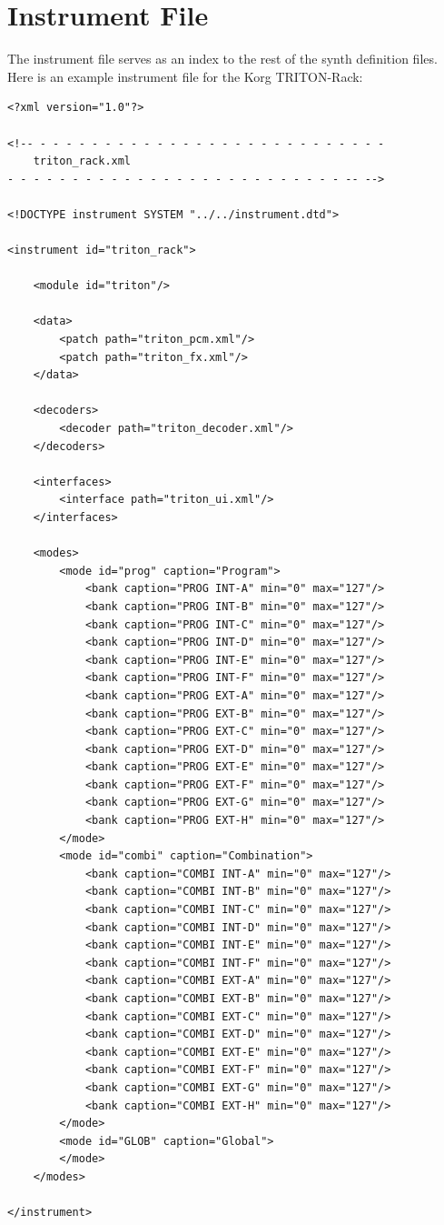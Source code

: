 \documentclass[a4paper,twoside,12pt]{article}
\begin{document}
\section{Instrument File}\label{instrument_file}
The instrument file serves as an index to the rest of the synth
definition files. Here is an example instrument file for the Korg
TRITON-Rack:

\begin{verbatim}
<?xml version="1.0"?>

<!-- - - - - - - - - - - - - - - - - - - - - - - - - - - -
    triton_rack.xml
- - - - - - - - - - - - - - - - - - - - - - - - - - -- -->

<!DOCTYPE instrument SYSTEM "../../instrument.dtd">

<instrument id="triton_rack">

    <module id="triton"/>

    <data>
        <patch path="triton_pcm.xml"/>
        <patch path="triton_fx.xml"/>
    </data>

    <decoders>
        <decoder path="triton_decoder.xml"/>
    </decoders>

    <interfaces>
        <interface path="triton_ui.xml"/>
    </interfaces>

    <modes>
        <mode id="prog" caption="Program">
            <bank caption="PROG INT-A" min="0" max="127"/>
            <bank caption="PROG INT-B" min="0" max="127"/>
            <bank caption="PROG INT-C" min="0" max="127"/>
            <bank caption="PROG INT-D" min="0" max="127"/>
            <bank caption="PROG INT-E" min="0" max="127"/>
            <bank caption="PROG INT-F" min="0" max="127"/>
            <bank caption="PROG EXT-A" min="0" max="127"/>
            <bank caption="PROG EXT-B" min="0" max="127"/>
            <bank caption="PROG EXT-C" min="0" max="127"/>
            <bank caption="PROG EXT-D" min="0" max="127"/>
            <bank caption="PROG EXT-E" min="0" max="127"/>
            <bank caption="PROG EXT-F" min="0" max="127"/>
            <bank caption="PROG EXT-G" min="0" max="127"/>
            <bank caption="PROG EXT-H" min="0" max="127"/>
        </mode>
        <mode id="combi" caption="Combination">
            <bank caption="COMBI INT-A" min="0" max="127"/>
            <bank caption="COMBI INT-B" min="0" max="127"/>
            <bank caption="COMBI INT-C" min="0" max="127"/>
            <bank caption="COMBI INT-D" min="0" max="127"/>
            <bank caption="COMBI INT-E" min="0" max="127"/>
            <bank caption="COMBI INT-F" min="0" max="127"/>
            <bank caption="COMBI EXT-A" min="0" max="127"/>
            <bank caption="COMBI EXT-B" min="0" max="127"/>
            <bank caption="COMBI EXT-C" min="0" max="127"/>
            <bank caption="COMBI EXT-D" min="0" max="127"/>
            <bank caption="COMBI EXT-E" min="0" max="127"/>
            <bank caption="COMBI EXT-F" min="0" max="127"/>
            <bank caption="COMBI EXT-G" min="0" max="127"/>
            <bank caption="COMBI EXT-H" min="0" max="127"/>
        </mode>
        <mode id="GLOB" caption="Global">
        </mode>
    </modes>

</instrument>
\end{verbatim}
\end{document}
